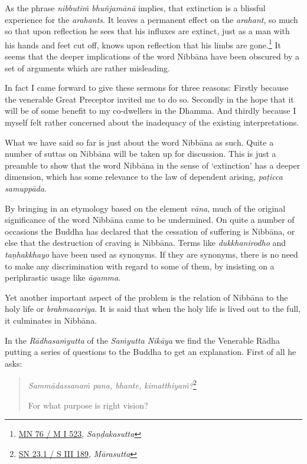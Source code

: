As the phrase \emph{nibbutiṁ bhuñjamānā} implies, that extinction is a blissful experience for the \emph{arahants}. It leaves a permanent effect on the \emph{arahant}, so much so that upon reflection he sees that his influxes are extinct, just as a man with his hands and feet cut off, knows upon reflection that his limbs are gone.\footnote{\href{https://suttacentral.net/mn76/pli/ms}{MN 76 / M I 523}, \emph{Saṇḍakasutta}} It seems that the deeper implications of the word Nibbāna have been obscured by a set of arguments which are rather misleading.

In fact I came forward to give these sermons for three reasons: Firstly because the venerable Great Preceptor invited me to do so. Secondly in the hope that it will be of some benefit to my co-dwellers in the Dhamma. And thirdly because I myself felt rather concerned about the inadequacy of the existing interpretations.

What we have said so far is just about the word Nibbāna as such. Quite a number of suttas on Nibbāna will be taken up for discussion. This is just a preamble to show that the word Nibbāna in the sense of `extinction' has a deeper dimension, which has some relevance to the law of dependent arising, \emph{paṭicca samuppāda}.

By bringing in an etymology based on the element \emph{vāna}, much of the original significance of the word Nibbāna came to be undermined. On quite a number of occasions the Buddha has declared that the cessation of suffering is Nibbāna, or else that the destruction of craving is Nibbāna. Terms like \emph{dukkhanirodho} and \emph{taṇhakkhayo} have been used as synonyms. If they are synonyms, there is no need to make any discrimination with regard to some of them, by insisting on a periphrastic usage like \emph{āgamma}.

Yet another important aspect of the problem is the relation of Nibbāna to the holy life or \emph{brahmacariya}. It is said that when the holy life is lived out to the full, it culminates in Nibbāna.

In the \emph{Rādhasaṁyutta} of the \emph{Saṁyutta Nikāya} we find the Venerable Rādha putting a series of questions to the Buddha to get an explanation. First of all he asks:

\begin{quote}
\emph{Sammādassanaṁ pana, bhante, kimatthiyaṁ?}\footnote{\href{https://suttacentral.net/sn23.1/pli/ms}{SN 23.1 / S III 189}, \emph{Mārasutta}}

For what purpose is right vision?
\end{quote}

